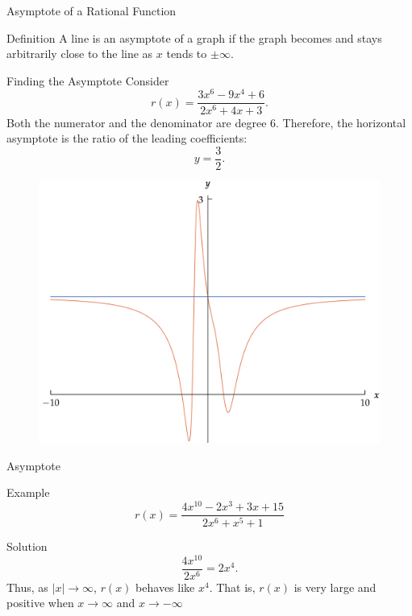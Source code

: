 \documentclass{beamer}
\begin{document}
\begin{frame}{Asymptote of a Rational Function}
  \begin{block}{Definition}
    A line is an asymptote of a graph if the graph becomes and stays arbitrarily close to the line as \(x\) tends to \(\pm\infty\).
  \end{block}
  \vspace{0.5em}
  \begin{exampleblock}{Finding the Asymptote}
    Consider
    \[
      r(x)=\frac{3x^6-9x^4+6}{2x^6+4x+3}.
    \]
    Both the numerator and the denominator are degree 6. Therefore, the horizontal asymptote is the ratio of the leading coefficients:
    \[
      y=\frac{3}{2}.
    \]
  \end{exampleblock}
\end{frame}
\begin{frame}
  \begin{figure}
    \centering
    \includegraphics[scale=0.2]{asymptote1.png}
  \end{figure}
\end{frame}

\begin{frame}{Asymptote}
  \begin{exampleblock}{Example}
    \[
      r(x) = \frac{4x^{10}-2x^3+3x+15}{2x^6+x^5+1}
    \]
  \end{exampleblock}
  \begin{block}{Solution}
    \[
      \frac{4x^{10}}{2x^6} = 2x^4.
    \]
    Thus, as \(|x|\to\infty\), \(r(x)\) behaves like \(x^{4}\). That is, \(r(x)\) is very large and positive when \( x \to \infty\) and \( x \to -\infty\) 
  \end{block}
\end{frame}
\end{document}
